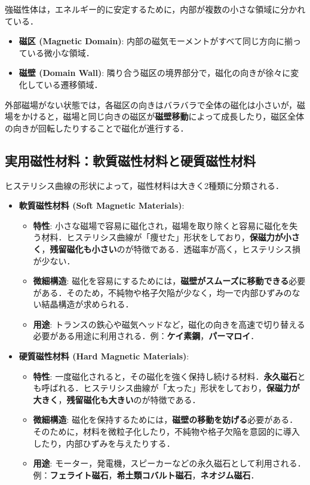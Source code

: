 \documentclass[11pt,a4paper]{ltjsarticle}
\newcommand{\supcite}[1]{\textsuperscript{\cite{#1}}}
\begin{document}
強磁性体は，エネルギー的に安定するために，内部が複数の小さな領域に分かれている．

\begin{itemize}
\item \textbf{磁区 (Magnetic Domain)}: 内部の磁気モーメントがすべて同じ方向に揃っている微小な領域\supcite{ref1}．
\item \textbf{磁壁 (Domain Wall)}: 隣り合う磁区の境界部分で，磁化の向きが徐々に変化している遷移領域\supcite{ref1}．
\end{itemize}

外部磁場がない状態では，各磁区の向きはバラバラで全体の磁化は小さいが，磁場をかけると，磁場と同じ向きの磁区が\textbf{磁壁移動}によって成長したり，磁区全体の向きが回転したりすることで磁化が進行する\supcite{ref1}．

\subsection{実用磁性材料：軟質磁性材料と硬質磁性材料}

ヒステリシス曲線の形状によって，磁性材料は大きく2種類に分類される．

\begin{itemize}
\item \textbf{軟質磁性材料 (Soft Magnetic Materials)}:
  \begin{itemize}
  \item \textbf{特性}: 小さな磁場で容易に磁化され，磁場を取り除くと容易に磁化を失う材料．ヒステリシス曲線が「痩せた」形状をしており，\textbf{保磁力が小さく}，\textbf{残留磁化も小さい}のが特徴である．透磁率が高く，ヒステリシス損が少ない\supcite{ref1}．
  \item \textbf{微細構造}: 磁化を容易にするためには，\textbf{磁壁がスムーズに移動できる}必要がある．そのため，不純物や格子欠陥が少なく，均一で内部ひずみのない結晶構造が求められる\supcite{ref1}．
  \item \textbf{用途}: トランスの鉄心や磁気ヘッドなど，磁化の向きを高速で切り替える必要がある用途に利用される．例：\textbf{ケイ素鋼}，\textbf{パーマロイ}\supcite{ref1}．
  \end{itemize}

\item \textbf{硬質磁性材料 (Hard Magnetic Materials)}:
  \begin{itemize}
  \item \textbf{特性}: 一度磁化されると，その磁化を強く保持し続ける材料．\textbf{永久磁石}とも呼ばれる．ヒステリシス曲線が「太った」形状をしており，\textbf{保磁力が大きく}，\textbf{残留磁化も大きい}のが特徴である\supcite{ref1}．
  \item \textbf{微細構造}: 磁化を保持するためには，\textbf{磁壁の移動を妨げる}必要がある．そのために，材料を微粒子化したり，不純物や格子欠陥を意図的に導入したり，内部ひずみを与えたりする\supcite{ref1}．
  \item \textbf{用途}: モーター，発電機，スピーカーなどの永久磁石として利用される．例：\textbf{フェライト磁石}，\textbf{希土類コバルト磁石}，\textbf{ネオジム磁石}\supcite{ref1}．
  \end{itemize}
\end{itemize}
\end{document}
